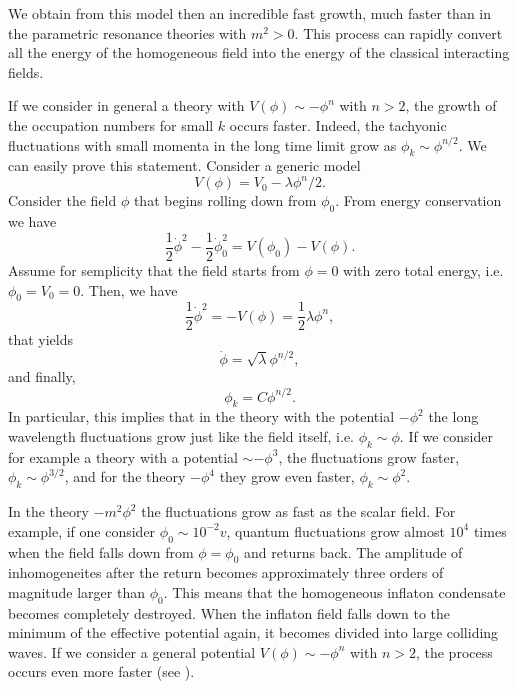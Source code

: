 \documentclass[11pt,a4paper,twoside]{book}
\begin{document}
We obtain from this model then an incredible fast growth, much faster than in the parametric resonance theories with $ m^{2} > 0 $. This process  can rapidly convert all the energy of the homogeneous field into the energy of the classical interacting fields.

If we consider in general a theory with $ V(\phi) \sim -\phi^{n} $ with $ n > 2 $, the growth of the occupation numbers for small $ k $ occurs faster. Indeed, the tachyonic fluctuations with small momenta in the long time limit grow as $\phi_{k} \sim \phi^{n/2}$. 
We can easily prove this statement. Consider a generic model
\begin{equation}
\label{Chap5:PotentialGeneric}
V(\phi)=V_{0}-\lambda\phi^{n}/2.
\end{equation}
Consider the field $\phi$ that begins rolling down from $\phi_{0}$. From energy conservation we have 
\begin{equation}
\label{Chao5:energyConservation}
\frac{1}{2}\dot{\phi}^{2} - \frac{1}{2}\dot{\phi}^{2}_{0} = V(\phi_{0}) - V(\phi).
\end{equation}
 Assume for semplicity that the field starts from $ \phi=0 $ with zero total energy, i.e. $ \phi_{0}=V_{0}=0 $. Then, we have 
 \begin{equation}
\label{Chap5:equationFieldFluctuation}
\frac{1}{2}\dot{\phi}^{2}=-V(\phi) = \frac{1}{2} \lambda\phi^{n},
 \end{equation}
that yields
\begin{equation}
\dot{\phi}=\sqrt{\lambda}\phi^{n/2},
\end{equation}
and finally,
\begin{equation}
\label{Chap5:dependenceFluctuationPotential}
\phi_{k}=C\phi^{n/2}.
\end{equation}
In particular, this implies that in the theory with the potential 
$ -\phi^{2} $ the long wavelength fluctuations grow just like the field itself, i.e. $ \phi_{k} \sim \phi $. If we consider for example a theory with a potential $\sim -\phi^{3} $, the fluctuations grow faster, $ \phi_{k} \sim \phi^{3/2} $, and for the theory $ -\phi^{4} $ they grow even faster, $ \phi_{k} \sim \phi^{2} $.

In the theory $ -m^{2}\phi^{2}$ the fluctuations grow as fast as the scalar field. For example, if one consider $ \phi_{0} \sim 10^{-2}v $, quantum fluctuations grow almost $ 10^{4} $ times when the field falls down from $ \phi=\phi_{0} $ and returns back. The amplitude of inhomogeneites after the return becomes approximately three orders of magnitude larger than $\phi_{0}$. This means that the homogeneous inflaton condensate becomes completely destroyed. When the inflaton field falls down to the minimum of the effective potential again, it becomes divided into large colliding waves. If we consider a general potential  $V(\phi) \sim -\phi^{n} $ with $ n>2 $, the process occurs even more faster (see \cite{Chap5:TachyonicInstability}).
\end{document}
